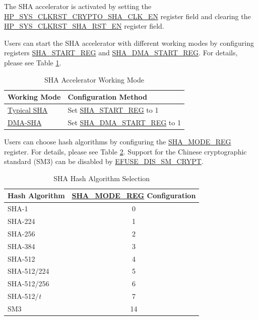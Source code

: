 \documentclass[main\_\_EN.tex]{subfiles}
\begin{document}
The SHA accelerator is activated by setting the \hyperref[fielddesc:HPSYSCLKRSTCRYPTOSHACLKEN]{HP\_SYS\_CLKRST\_CRYPTO\_SHA\_CLK\_EN} register field and clearing the \hyperref[fielddesc:HPSYSCLKRSTSHARSTEN]{HP\_SYS\_CLKRST\_SHA\_RST\_EN} register field. 

Users can start the SHA accelerator with different working modes by configuring registers \hyperref[regdesc:SHASTARTREG]{SHA\_START\_REG} and \hyperref[regdesc:SHADMASTARTREG]{SHA\_DMA\_START\_REG}. For details, please see Table \ref{tab:sha-hash-algo-select}.

\begin{longtable}[c]{ | l | l | }
\caption{SHA Accelerator Working Mode}
\label{tab:sha-hash-algo-select}
\\\hline
\rowcolor{lightgray}
\textbf{Working Mode}      & \textbf{Configuration Method}\\
    \hline
    \hyperref[sec:sha-typical-sha]{Typical SHA}      &  Set \hyperref[regdesc:SHASTARTREG]{SHA\_START\_REG} to 1   \\
    \hline
    \hyperref[sec:sha-dma-sha]{DMA-SHA}           &  Set \hyperref[regdesc:SHADMASTARTREG]{SHA\_DMA\_START\_REG} to 1   \\
    \hline
\end{longtable}

Users can choose hash algorithms by configuring the \hyperref[regdesc:SHAMODEREG]{SHA\_MODE\_REG} register. For details, please see Table \ref{tab:sha-mode-summ}. Support for the Chinese cryptographic standard (SM3) can be disabled by \hyperref[fielddesc:EFUSEDISSMCRYPT]{EFUSE\_DIS\_SM\_CRYPT}.

\begin{longtable}[c]{| l | c |}
\caption{SHA Hash Algorithm Selection}
\label{tab:sha-mode-summ}
\\\hline
\rowcolor{lightgray}
\textbf{Hash Algorithm} & \textbf{\hyperref[regdesc:SHAMODEREG]{SHA\_MODE\_REG} Configuration}\\\hline
    SHA-1               & 0  \\\hline
    SHA-224             & 1  \\\hline
    SHA-256             & 2  \\\hline
    SHA-384             & 3  \\\hline
    SHA-512             & 4  \\\hline
    SHA-512/224         & 5  \\\hline
    SHA-512/256         & 6  \\\hline
    SHA-512/{\it{t}}    & 7  \\\hline
    SM3                 & 14 \\\hline
\end{longtable}
\end{document}
